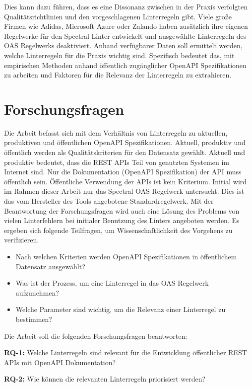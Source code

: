 Dies kann dazu führen, dass es eine Dissonanz zwischen in der Praxis verfolgten Qualitätsrichtlinien und den vorgeschlagenen Linterregeln gibt. Viele große Firmen wie Adidas, Microsoft Azure oder Zalando haben zusätzlich ihre eigenen Regelwerke für den Spectral Linter entwickelt und ausgewählte Linterregeln des OAS Regelwerks deaktiviert. Anhand verfügbarer Daten soll ermittelt werden, welche Linterregeln für die Praxis wichtig sind. Spezifisch bedeutet das, mit empirischen Methoden anhand öffentlich zugänglicher OpenAPI Spezifikationen zu arbeiten und Faktoren für die Relevanz der Linterregeln zu extrahieren.
    
\section{Forschungsfragen}
Die Arbeit befasst sich mit dem Verhältnis von Linterregeln zu aktuellen, produktiven und öffentlichen OpenAPI Spezifikationen. Aktuell, produktiv und öffentlich werden als Qualitätskriterien für den Datensatz gewählt. Aktuell und produktiv bedeutet, dass die REST APIs Teil von genutzten Systemen im Internet sind. Nur die Dokumentation (OpenAPI Spezifikation) der API muss öffentlich sein. Öffentliche Verwendung der APIs ist kein Kriterium. Initial wird im Rahmen dieser Arbeit nur das Spectral OAS Regelwerk untersucht. Dies ist das vom Hersteller des Tools angebotene Standardregelwerk. Mit der Beantwortung der Forschungsfragen wird auch eine Lösung des Problems von vielen Linterfehlern bei initialer Benutzung des Linters angeboten werden. Es ergeben sich folgende Teilfragen, um Wissenschaftlichkeit des Vorgehens zu verifizieren.

\begin{itemize}
    \item Nach welchen Kriterien werden OpenAPI Spezifikationen in öffentlichem Datensatz ausgewählt?
    \item Was ist der Prozess, um eine Linterregel in das OAS Regelwerk aufzunehmen?
    \item Welche Parameter sind wichtig, um die Relevanz einer Linterregel zu bestimmen?
\end{itemize}

Die Arbeit soll die folgenden Forschungsfragen beantworten:

\textbf{RQ-1:}  Welche Linterregeln sind relevant für die Entwicklung öffentlicher REST APIs mit OpenAPI Dokumentation?

\textbf{RQ-2:} Wie können die relevanten Linterregeln priorisiert werden?

